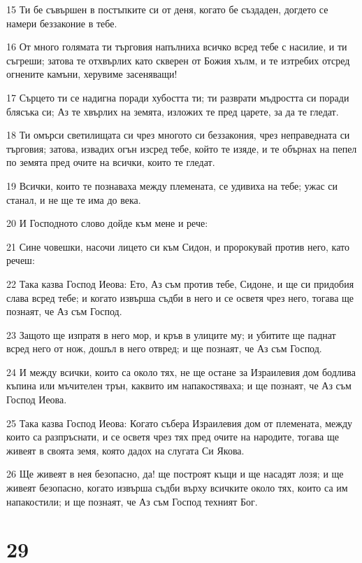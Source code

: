\par 15 Ти бе съвършен в постъпките си от деня, когато бе създаден, догдето се намери беззаконие в тебе.
\par 16 От много голямата ти търговия напълниха всичко всред тебе с насилие, и ти съгреши; затова те отхвърлих като скверен от Божия хълм, и те изтребих отсред огнените камъни, херувиме засеняващи!
\par 17 Сърцето ти се надигна поради хубостта ти; ти разврати мъдростта си поради блясъка си; Аз те хвърлих на земята, изложих те пред царете, за да те гледат.
\par 18 Ти омърси светилищата си чрез многото си беззакония, чрез неправедната си търговия; затова, извадих огън изсред тебе, който те изяде, и те обърнах на пепел по земята пред очите на всички, които те гледат.
\par 19 Всички, които те познаваха между племената, се удивиха на тебе; ужас си станал, и не ще те има до века.
\par 20 И Господното слово дойде към мене и рече:
\par 21 Сине човешки, насочи лицето си към Сидон, и пророкувай против него, като речеш:
\par 22 Така казва Господ Иеова: Ето, Аз съм против тебе, Сидоне, и ще си придобия слава всред тебе; и когато извърша съдби в него и се осветя чрез него, тогава ще познаят, че Аз съм Господ.
\par 23 Защото ще изпратя в него мор, и кръв в улиците му; и убитите ще паднат всред него от нож, дошъл в него отвред; и ще познаят, че Аз съм Господ.
\par 24 И между всички, които са около тях, не ще остане за Израилевия дом бодлива къпина или мъчителен трън, каквито им напакостяваха; и ще познаят, че Аз съм Господ Иеова.
\par 25 Така казва Господ Иеова: Когато събера Израилевия дом от племената, между които са разпръснати, и се осветя чрез тях пред очите на народите, тогава ще живеят в своята земя, която дадох на слугата Си Якова.
\par 26 Ще живеят в нея безопасно, да! ще построят къщи и ще насадят лозя; и ще живеят безопасно, когато извърша съдби върху всичките около тях, които са им напакостили; и ще познаят, че Аз съм Господ техният Бог.

\chapter{29}

